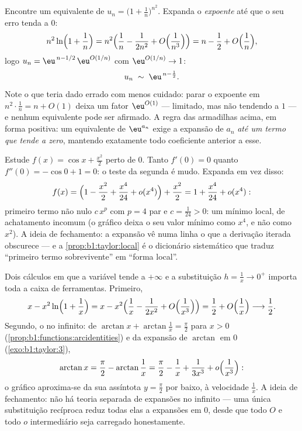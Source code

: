 \begin{example}\label{ex:b1:taylor:expdiscipline}
Encontre um equivalente de $u_n = \bigl(1 + \frac1n\bigr)^{n^2}$.
Expanda o \emph{expoente} até que o seu erro tenda a $0$:
\[
n^2 \ln\Bigl(1 + \frac1n\Bigr)
= n^2\Bigl(\frac1n - \frac{1}{2n^2} +
O\Bigl(\frac{1}{n^3}\Bigr)\Bigr)
= n - \frac12 + O\Bigl(\frac1n\Bigr),
\]
logo $u_n = \eu^{\,n - 1/2}\,\eu^{O(1/n)}$ com $\eu^{O(1/n)} \to
1$:
\[
u_n \;\sim\; \eu^{\,n - \frac12} .
\]
Note o que teria dado errado com menos cuidado: parar o expoente em
$n^2\cdot\frac1n = n + O(1)$ deixa um fator $\eu^{O(1)}$ --- limitado, mas não tendendo a $1$ --- e
nenhum equivalente pode ser afirmado. A regra das armadilhas acima, em
forma positiva: um equivalente de $\eu^{a_n}$ exige a expansão de $a_n$
\emph{até um termo que tende a zero}, mantendo exatamente todo
coeficiente anterior a esse.
\end{example}

\begin{example}\label{ex:b1:taylor:flatmin}
Estude $f(x) = \cos x + \frac{x^2}{2}$ perto de $0$. Tanto $f'(0) =
0$ quanto $f''(0) = -\cos 0 + 1 = 0$: o teste da
segunda  é mudo. Expanda em vez disso:
\[
f(x) = \Bigl(1 - \frac{x^2}{2} + \frac{x^4}{24} +
o(x^4)\Bigr) + \frac{x^2}{2}
= 1 + \frac{x^4}{24} + o(x^4) :
\]
primeiro termo não nulo $c\,x^p$ com $p = 4$ par e $c =
\frac{1}{24} > 0$: um mínimo
local, de achatamento incomum (o gráfico deixa o seu valor mínimo como
$x^4$, e não como $x^2$). A ideia de fechamento: a expansão vê numa
linha o que a derivação iterada obscurece --- e a \cref{prop:b1:taylor:local} é o dicionário
sistemático que traduz ``primeiro termo sobrevivente'' em ``forma
local''.
\end{example}

\begin{example}\label{ex:b1:taylor:atinfinity}
Dois cálculos em que a variável tende a $+\infty$ e a substituição
$h = \frac1x \to 0^+$ importa toda a caixa de ferramentas. Primeiro,
\[
x - x^2\ln\Bigl(1 + \frac1x\Bigr)
= x - x^2\Bigl(\frac1x - \frac{1}{2x^2} +
O\Bigl(\frac{1}{x^3}\Bigr)\Bigr)
= \frac12 + O\Bigl(\frac1x\Bigr) \longrightarrow \frac12 .
\]
Segundo, o  no infinito: de $\arctan x +
\arctan\frac1x = \frac\pi2$ para $x > 0$ (\cref{prop:b1:functions:arcidentities}) e
da expansão de $\arctan$ em $0$ (\cref{exo:b1:taylor:3}),
\[
\arctan x = \frac\pi2 - \arctan\frac1x
= \frac\pi2 - \frac1x + \frac{1}{3x^3} +
o\Bigl(\frac{1}{x^3}\Bigr) :
\]
o gráfico aproxima-se da sua assíntota $y = \frac\pi2$ por baixo, à velocidade
$\frac1x$. A ideia de fechamento: não há teoria separada de expansões
no infinito --- uma única substituição recíproca reduz todas elas a
expansões em $0$, desde que todo $O$ e todo $o$ intermediário seja
carregado honestamente.
\end{example}

